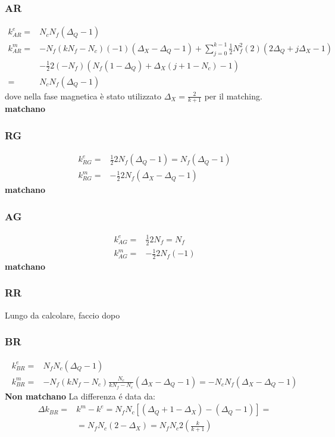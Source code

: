 \documentclass[a4paper,12pt]{article}
\begin{document}
  \subsubsection*{AR}
  \begin{align*}
   k^e_{AR} = & N_c N_f (\Delta_Q - 1) \\
   k^m_{AR} = & - N_f( k N_f - N_c) (-1) ( \Delta_X - \Delta_Q - 1 ) + \sum_{j=0}^{k-1} \frac{1}{2} N_f^2 (2) ( 2 \Delta_Q + j \Delta_X - 1) \\
   & - \frac{1}{2} 2 (-N_f) \left( N_f (1-\Delta_Q) + \Delta_X( j+1 - N_c) -1 \right) \\ =
   & N_c N_f ( \Delta_Q -1 )
  \end{align*}
  dove nella fase magnetica è stato utilizzato $\Delta_X = \frac{2}{k+1}$ per il matching.\\
  \textbf{matchano}


\subsubsection*{RG} 
\begin{align*}
k^e_{RG} = & \frac{1}{2} 2 N_f ( \Delta_Q -1) = N_f ( \Delta_Q -1) \\
k^m_{RG} = & - \frac{1}{2}  2 N_f ( \Delta_X - \Delta_Q -1)
\end{align*}
\textbf{ matchano}

\subsubsection*{AG}
\begin{align*}
k^e_{AG} = & \frac{1}{2}  2 N_f = N_f \\
k^m_{AG} = & - \frac{1}{2}  2 N_f ( -1) 
\end{align*}
\textbf{matchano}
	\subsubsection*{RR}
  
	 Lungo da calcolare, faccio dopo  
  \subsubsection*{BR}
  \begin{align*}
   k^e_{BR} = & N_f N_c ( \Delta_Q - 1)\\
   k^m_{BR} = & - N_f (k N_f - N_c) \frac{N_c}{k N_f - N_c} ( \Delta_X - \Delta_Q -1) = - N_c N_f ( \Delta_X - \Delta_Q -1)
  \end{align*}
  \textbf{Non matchano}
   La differenza \'e data da:
   \begin{align*}
   \Delta k_{BR} =& k^m - k^e = N_f N_c [ (\Delta_Q +1 - \Delta_X ) - (\Delta_Q -1)] = \\
   & = N_f N_c ( 2 - \Delta_X) = N_f N_c 2 \left( \frac{k}{k+1} \right)
   \end{align*}
\end{document}
